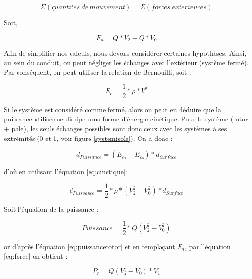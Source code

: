 \documentclass[a4paper,10pt]{report}
\begin{document}
	\begin{equation}
	  \label{eq:quantitemouvement}
	  \Sigma(quantit\acute{e}s \ de \ mouvement) = \Sigma (forces \ 
ext\acute{e}rieures) 
	\end{equation}
	
	Soit,
	
	\begin{equation}
	  \label{eq:force}
	  F_{n} = Q * V_{2} - Q * V_{0} 
	\end{equation}
	
	Afin de simplifier nos calculs, nous devons considérer certaines 
hypothèses. Ainsi, au sein du conduit, on peut négliger les échanges avec 
l'extérieur (système fermé). Par conséquent, on peut utiliser la relation de 
Bernouilli, soit :

	\begin{equation}
	  \label{eq:cinetique}
	  E_{c} = \frac{1}{2} * \rho * V^{2} 
	\end{equation}
	
	Si le système est considéré comme fermé, alors on peut en déduire que la 
puissance utilisée se dissipe sous forme d'énergie cinétique. Pour le système 
(rotor + pale), les seuls échanges possibles sont donc ceux avec les systèmes à 
ses extrémités ({0} et {1}, voir figure \ref{systemisole}). On a donc :

	\begin{equation}
	  d_{Puissance} = (E_{c_{2}} - E_{c_{0}}) * d_{Surface}
	\end{equation}

	d'où en utilisant l'équation \ref{eq:cinetique}:
	
	\begin{equation}
	  d_{Puissance} = \frac{1}{2} * \rho * (V_{2}^{2} - V_{0}^{2}) * 
d_{Surface}
	\end{equation}
	
	Soit l'équation de la puissance :
	
	\begin{equation}
	  \label{eq:puissance}
	  Puissance = \frac{1}{2} * Q(V_{2}^{2}-V_{0}^{2}) 
	\end{equation}
	
	or d'après l'équation \ref{eq:puissancerotor} et en remplaçant 
$F_{n}$, par l'équation \ref{eq:force} on obtient : 
	
	\begin{equation}
	  \label{eq:puissance2}
	  P_{r} = Q(V_{2}-V_{0})*V_{1} 
	\end{equation}
	
\end{document}
